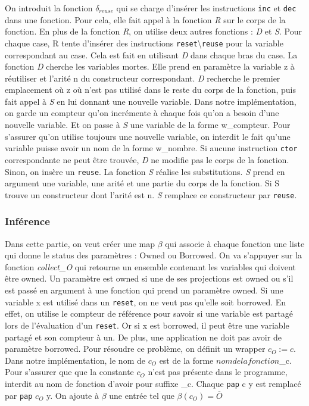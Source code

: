 \documentclass{rapportECL}
\begin{document}
On introduit la fonction $\delta_{reuse}$ qui se charge d'insérer les instructions \verb|inc| et \verb|dec| dans une fonction. Pour cela, elle fait appel à la fonction \textit{R} sur le corps de la fonction.
En plus de la fonction \textit{R}, on utilise deux autres fonctions : \textit{D} et \textit{S}.
Pour chaque case, R tente d'insérer des instructions \verb|reset|\textbackslash \verb|reuse| pour la variable correspondant au case. Cela est fait en utilisant \textit{D} dans chaque bras du case.
La fonction \textit{D} cherche les variables mortes. Elle prend en paramètre la variable z à réutiliser et l'arité n du constructeur correspondant. 
\textit{D} recherche le premier emplacement où z où n'est pas utilisé dans le reste du corps de la fonction, puis fait appel à \textit{S} en lui donnant une nouvelle variable. 
Dans notre implémentation, on garde un compteur qu'on incrémente à chaque fois qu'on a besoin d'une nouvelle variable. Et on passe à \textit{S} une variable de la forme w\_compteur. Pour s'assurer qu'on utilise toujours une nouvelle variable, on interdit le fait qu'une variable puisse avoir un nom de la forme w\_nombre. Si aucune instruction \verb|ctor| correspondante ne peut être trouvée, \textit{D} ne modifie pas le corps de la fonction. Sinon, on insère un \verb|reuse|.
La fonction \textit{S} réalise les substitutions. \textit{S} prend en argument une variable, une arité et une partie du corps de la fonction. Si S trouve un constructeur dont l'arité est n. \textit{S} remplace ce constructeur par \verb|reuse|.


\subsubsection{Inférence}
Dans cette partie, on veut créer une map $\beta$ qui associe à chaque fonction une liste qui donne le status des paramètres : Owned ou Borrowed.
On va s'appuyer sur la fonction \textit{collect\_O} qui retourne un ensemble contenant les variables qui doivent être owned.
Un paramètre est owned si une de ses projections est owned ou s'il est passé en argument à une fonction qui prend un paramètre owned.
Si une variable x est utilisé dans un \verb|reset|, on ne veut pas qu'elle soit borrowed. 
En effet, on utilise le compteur de référence pour savoir si une variable est partagé lors de l'évaluation d'un \verb|reset|. 
Or si x est borrowed, il peut être une variable partagé et son compteur à un.
De plus, une application ne doit pas avoir de paramètre borrowed. Pour résoudre ce problème, on définit un wrapper $c_O := c$. 
Dans notre implémentation, le nom de $c_O$ est de la forme $nom de la fonction$\_c. 
Pour s'assurer que que la constante $c_O$ n'est pas présente dans le programme, interdit au nom de fonction d'avoir pour suffixe \_c.
Chaque \verb|pap| c y est remplacé par \verb|pap| $c_O$ y. On ajoute à $\beta$ une entrée tel que $\beta(c_O) = \overline{O}$
\end{document}
